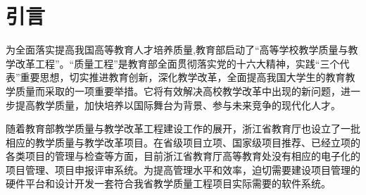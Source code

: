 
\chapter{引言}
为全面落实提高我国高等教育人才培养质量,教育部启动了“高等学校教学质量与教学改革工程”。“质量工程”是教育部全面贯彻落实党的十六大精神，实践“三个代表”重要思想，切实推进教育创新，深化教学改革，全面提高我国大学生的教育教学质量而采取的一项重要举措。它将有效解决高校教学改革中出现的新问题，进一步提高教学质量，加快培养以国际舞台为背景、参与未来竞争的现代化人才。

随着教育部教学质量与教学改革工程建设工作的展开，浙江省教育厅也设立了一批相应的教学质量与教学改革项目。在省级项目立项、国家级项目推荐、已经立项的各类项目的管理与检查等方面，目前浙江省教育厅高等教育处没有相应的电子化的项目管理、项目申报评审系统。为提高管理水平和效率，迫切需要建设项目管理的硬件平台和设计开发一套符合我省教学质量工程项目实际需要的软件系统。
